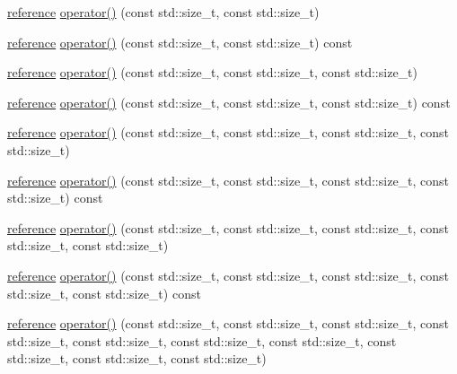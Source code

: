 \begin{DoxyCompactItemize}
\item 
\hyperlink{classandres_1_1View_aebdd1f19272b743b4422ff8ba18fc11a}{reference} \hyperlink{classandres_1_1View_a216831a61d22edc3b74cf09df8e537f3}{operator()} (const std\+::size\+\_\+t, const std\+::size\+\_\+t)
\item 
\hyperlink{classandres_1_1View_aebdd1f19272b743b4422ff8ba18fc11a}{reference} \hyperlink{classandres_1_1View_aea4e4eddd7cd0b1fc5ac97dee672b031}{operator()} (const std\+::size\+\_\+t, const std\+::size\+\_\+t) const 
\item 
\hyperlink{classandres_1_1View_aebdd1f19272b743b4422ff8ba18fc11a}{reference} \hyperlink{classandres_1_1View_a46b12868d2aa22f89f65d604885dc1eb}{operator()} (const std\+::size\+\_\+t, const std\+::size\+\_\+t, const std\+::size\+\_\+t)
\item 
\hyperlink{classandres_1_1View_aebdd1f19272b743b4422ff8ba18fc11a}{reference} \hyperlink{classandres_1_1View_a50af7993da2ae2efad8a250ce51bb416}{operator()} (const std\+::size\+\_\+t, const std\+::size\+\_\+t, const std\+::size\+\_\+t) const 
\item 
\hyperlink{classandres_1_1View_aebdd1f19272b743b4422ff8ba18fc11a}{reference} \hyperlink{classandres_1_1View_acd5927bb3d8203e4811c6f17872b1c84}{operator()} (const std\+::size\+\_\+t, const std\+::size\+\_\+t, const std\+::size\+\_\+t, const std\+::size\+\_\+t)
\item 
\hyperlink{classandres_1_1View_aebdd1f19272b743b4422ff8ba18fc11a}{reference} \hyperlink{classandres_1_1View_ad7c89152e0d8d06c5ccf4377b9684d14}{operator()} (const std\+::size\+\_\+t, const std\+::size\+\_\+t, const std\+::size\+\_\+t, const std\+::size\+\_\+t) const 
\item 
\hyperlink{classandres_1_1View_aebdd1f19272b743b4422ff8ba18fc11a}{reference} \hyperlink{classandres_1_1View_aee5664db40d9e07abe0dd57262b5191e}{operator()} (const std\+::size\+\_\+t, const std\+::size\+\_\+t, const std\+::size\+\_\+t, const std\+::size\+\_\+t, const std\+::size\+\_\+t)
\item 
\hyperlink{classandres_1_1View_aebdd1f19272b743b4422ff8ba18fc11a}{reference} \hyperlink{classandres_1_1View_ac188ed9042fce60401acd72ac489fed9}{operator()} (const std\+::size\+\_\+t, const std\+::size\+\_\+t, const std\+::size\+\_\+t, const std\+::size\+\_\+t, const std\+::size\+\_\+t) const 
\item 
\hyperlink{classandres_1_1View_aebdd1f19272b743b4422ff8ba18fc11a}{reference} \hyperlink{classandres_1_1View_a2be86ccd328fc276f37686fb1872cb9c}{operator()} (const std\+::size\+\_\+t, const std\+::size\+\_\+t, const std\+::size\+\_\+t, const std\+::size\+\_\+t, const std\+::size\+\_\+t, const std\+::size\+\_\+t, const std\+::size\+\_\+t, const std\+::size\+\_\+t, const std\+::size\+\_\+t, const std\+::size\+\_\+t)

\end{DoxyCompactItemize}
